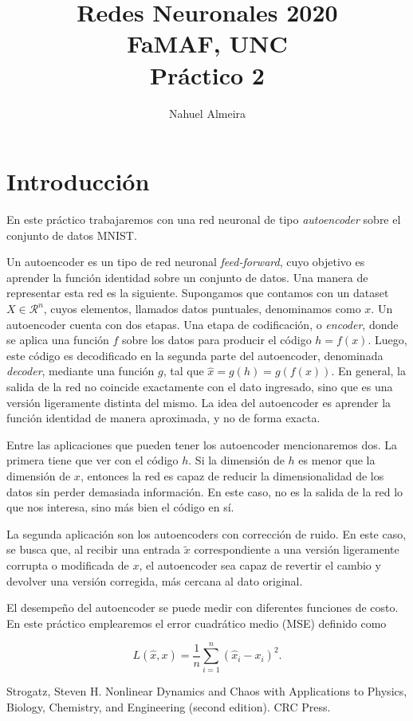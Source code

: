 \documentclass[10pt,twocolumn]{article}
\begin{document}
\author{Nahuel Almeira}

\title{Redes Neuronales 2020\\ FaMAF, UNC\\ Práctico 2}

\maketitle

\section{Introducción}

En este práctico trabajaremos con una red neuronal de tipo \emph{autoencoder} sobre el conjunto de datos MNIST.

Un autoencoder es un tipo de red neuronal \emph{feed-forward}, cuyo objetivo es aprender la función identidad sobre un conjunto de datos. Una manera de representar esta red es la siguiente. Supongamos que contamos con un dataset $X\in \mathcal{R}^n$, cuyos elementos, llamados datos puntuales, denominamos como $x$. Un autoencoder cuenta con dos etapas. Una etapa de codificación, o \emph{encoder}, donde se aplica una función $f$ sobre los datos para producir el código $h = f(x)$. Luego, este código es decodificado en la segunda parte del autoencoder, denominada \emph{decoder}, mediante una función $g$, tal que $\hat{x} = g(h) = g(f(x))$. En general, la salida de la red no coincide exactamente con el dato ingresado, sino que es una versión ligeramente distinta del mismo. La idea del autoencoder es aprender la función identidad de manera aproximada, y no de forma exacta.

Entre las aplicaciones que pueden tener los autoencoder mencionaremos dos. La primera tiene que ver con el código $h$. Si la dimensión de $h$ es menor que la dimensión de $x$, entonces la red es capaz de reducir la dimensionalidad de los datos sin perder demasiada información. En este caso, no es la salida de la red lo que nos interesa, sino más bien el código en sí. 

La segunda aplicación son los autoencoders con corrección de ruido. En este caso, se busca que, al recibir una entrada $\tilde{x}$ correspondiente a una versión ligeramente corrupta o modificada de $x$, el autoencoder sea capaz de revertir el cambio y devolver una versión corregida, más cercana al dato original.

El desempeño del autoencoder se puede medir con diferentes funciones de costo. En este práctico emplearemos el error cuadrático medio (MSE) definido como

\begin{equation}
L(\hat{x}, x) = \dfrac{1}{n} \sum_{i=1}^n (\hat{x}_i - x_i)^2.
\end{equation}

\begin{thebibliography}{9}
Strogatz, Steven H. Nonlinear Dynamics and Chaos with Applications to Physics, Biology, Chemistry, and Engineering (second edition). CRC Press.
\end{thebibliography}
\end{document}
